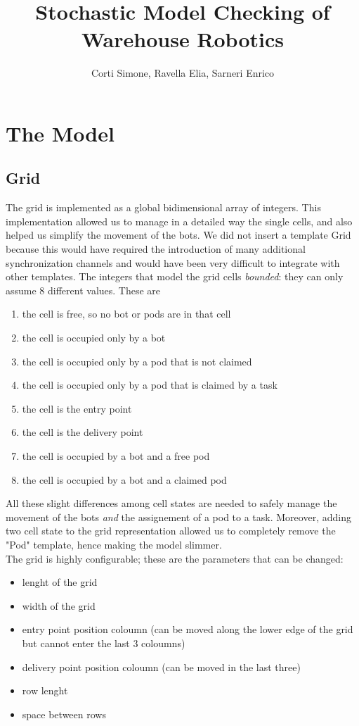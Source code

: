 \documentclass[10pt,a4paper]{article}
\title{Stochastic Model Checking of Warehouse Robotics}
\author{Corti Simone, Ravella Elia, Sarneri Enrico}
\begin{document}
	\begin{titlepage}
		\maketitle
	\end{titlepage}
	
	\section{The Model}
		\subsection{Grid}
			The grid is implemented as a global bidimensional array of integers. This implementation allowed us to manage in a detailed way the single cells, and also helped us simplify the movement of the bots. We did not insert a template Grid because this would have required the introduction of many additional synchronization channels and would have been very difficult to integrate with other templates.
			The integers that model the grid cells \emph{bounded}: they can only assume 8 different values. These are
			\begin{enumerate}[start=0, label={\arabic* :}]
				\item the cell is free, so no bot or pods are in that cell
				\item the cell is occupied only by a bot
				\item the cell is occupied only by a pod that is not claimed
				\item the cell is occupied only by a pod that is claimed by a task 
				\item the cell is the entry point 
				\item the cell is the delivery point
				\item the cell is occupied by a bot and a free pod
				\item the cell is occupied by a bot and a claimed pod
			\end{enumerate}
			All these slight differences among cell states are needed to safely manage the movement of the bots \emph{and} the assignement of a pod to a task. Moreover, adding two cell state to the grid representation allowed us to completely remove the "Pod" template, hence making the model slimmer.\\
			The grid is highly configurable; these are the parameters that can be changed:
			\begin{itemize}
				\item lenght of the grid
				\item width of the grid
				\item entry point position coloumn (can be moved along the lower edge of the grid but cannot enter the last 3 coloumns) 
				\item delivery point position coloumn (can be moved in the last three)
				\item row lenght
				\item space between rows
			\end{itemize}
\end{document}
